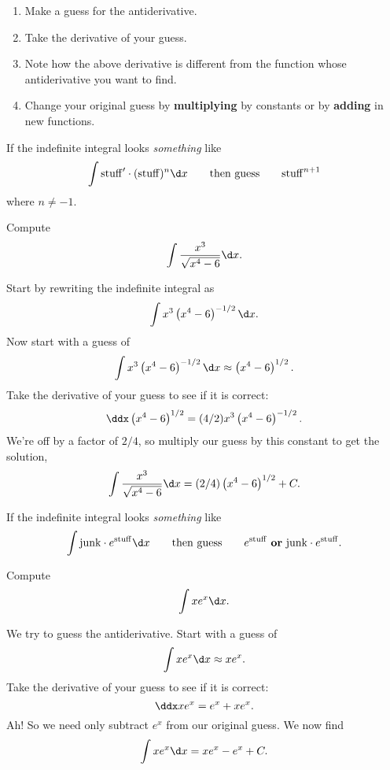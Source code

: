 \begin{guessingAntiderivatives}\hfil
\begin{enumerate}
\item Make a guess for the antiderivative.
\item Take the derivative of your guess.
\item Note how the above derivative is different from the function
  whose antiderivative you want to find.
\item Change your original guess by \textbf{multiplying} by constants
  or by \textbf{adding} in new functions.
\end{enumerate}
\end{guessingAntiderivatives}

\begin{template}\label{template:powerchain}
If the indefinite integral looks \emph{something} like
\[
\int \mathrm{stuff}' \cdot (\mathrm{stuff})^n \d x \qquad\text{then guess} \qquad \mathrm{stuff}^{n+1}
\]
where $n\ne -1$.
\end{template}

\begin{example} Compute
\[
\int \frac{x^3}{\sqrt{x^4 -6}} \d x.
\]
\end{example}

\begin{solution}
Start by rewriting the indefinite integral as
\[
\int x^3\left(x^4 -6\right)^{-1/2} \d x.
\]
Now start with a guess of 
\[
\int x^3\left(x^4 -6\right)^{-1/2} \d x \approx \left(x^4 -6\right)^{1/2}.
\]
Take the derivative of your guess to see if it is correct:
\[
\ddx  \left(x^4 -6\right)^{1/2} = (4/2)x^3\left(x^4 -6\right)^{-1/2}.
\]
We're off by a factor of $2/4$, so multiply our guess by this constant
to get the solution,
\[
\int \frac{x^3}{\sqrt{x^4 -6}} \d x = (2/4)\left(x^4 -6\right)^{1/2}+C.
\]
\end{solution}


\begin{template}\label{template:echain}
If the indefinite integral looks \emph{something} like
\[
\int \mathrm{junk}\cdot e^{\mathrm{stuff}} \d x \qquad\text{then
  guess}\qquad e^{\mathrm{stuff}} \text{ \textbf{or} }\mathrm{junk}
\cdot e^{\mathrm{stuff}}.
\]
\end{template}


\begin{example}
Compute
\[
\int xe^{x} \d x.
\]
\end{example}


\begin{solution}
We try to guess the antiderivative. Start with a guess of
\[
\int xe^x \d x \approx xe^x.
\]
Take the derivative of your guess to see if it is correct:
\[
\ddx xe^x = e^x + xe^x.
\]
Ah! So we need only subtract $e^x$ from our original guess.  We now
find
\[
\int xe^x \d x =xe^x - e^x + C.
\]
\end{solution}





